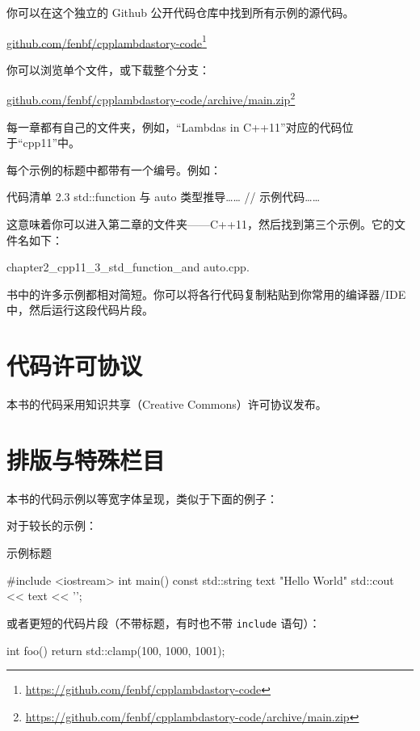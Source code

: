 你可以在这个独立的 Github 公开代码仓库中找到所有示例的源代码。

\url{github.com/fenbf/cpplambdastory-code}\footnote{\url{https://github.com/fenbf/cpplambdastory-code}}

你可以浏览单个文件，或下载整个分支：

\url{github.com/fenbf/cpplambdastory-code/archive/main.zip}\footnote{\url{https://github.com/fenbf/cpplambdastory-code/archive/main.zip}}

每一章都有自己的文件夹，例如，“Lambdas in C++11”对应的代码位于“cpp11”中。

每个示例的标题中都带有一个编号。例如：

\begin{codeboxt}{代码清单 2.3 std::function 与 auto 类型推导……}
// 示例代码……
\end{codeboxt}

这意味着你可以进入第二章的文件夹——C++11，然后找到第三个示例。它的文件名如下：

\begin{codebox}
chapter2_cpp11_3_std_function_and auto.cpp.
\end{codebox}

书中的许多示例都相对简短。你可以将各行代码复制粘贴到你常用的编译器/IDE 中，然后运行这段代码片段。

\section{代码许可协议}

本书的代码采用知识共享（Creative Commons）许可协议发布。

\section{排版与特殊栏目}

本书的代码示例以等宽字体呈现，类似于下面的例子：

对于较长的示例：

示例标题

\begin{codebox}
#include <iostream>
int main() {
const std::string text { "Hello World" }
std::cout << text << '\n';
}
\end{codebox}

或者更短的代码片段（不带标题，有时也不带 \texttt{include} 语句）：

\begin{codebox}
int foo() {
return std::clamp(100, 1000, 1001);
}
\end{codebox}

